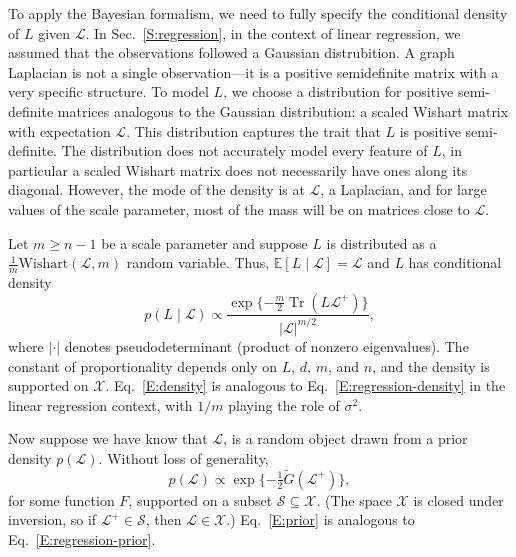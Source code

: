 \documentclass[12pt]{article}
\DeclareMathOperator*{\Tr}{Tr}
\newcommand{\E}{\mathbb{E}}
\theoremstyle{plain}
\begin{document}
To apply the Bayesian formalism, we need to fully specify the
conditional density of $L$ given $\mathcal{L}$.  In
Sec.~\ref{S:regression}, in the context of linear regression, we
assumed that the observations followed a Gaussian distrubition.  A
graph Laplacian is not a single observation---it is a positive
semidefinite matrix with a very specific structure.  To model $L$, we
choose a distribution for positive semi-definite matrices analogous to
the Gaussian distribution: a scaled Wishart matrix with expectation
$\mathcal{L}$.  This distribution captures the trait that $L$ is
positive semi-definite.  The distribution does not accurately model
every feature of $L$, in particular a scaled Wishart matrix does not
necessarily have ones along its diagonal.  However, the mode of the
density is at $\mathcal{L}$, a Laplacian, and for large values of the
scale parameter, most of the mass will be on matrices close to
$\mathcal{L}$.

Let $m \geq n - 1$ be a scale parameter
and suppose $L$ is distributed as a
$\tfrac{1}{m} \mathrm{Wishart}(\mathcal{L}, m)$ random variable.
Thus, $\E[L \mid \mathcal{L}] = \mathcal{L}$ and $L$ has conditional density
\begin{equation}\label{E:density}
  p(L \mid \mathcal{L})
    \propto
      \frac{\exp\{ -\frac{m}{2} \Tr(L \mathcal{L}^+)\}}
           {|\mathcal{L}|^{m/2}},
\end{equation}
where $|\cdot|$ denotes pseudodeterminant (product of nonzero
eigenvalues).  The constant of proportionality depends only on $L$,
$d$, $m$, and $n$, and the density is supported on $\mathcal{X}$.
Eq.~\eqref{E:density} is analogous to Eq.~\eqref{E:regression-density}
in the linear regression context, with $1/m$ playing the role of
$\sigma^2$.

Now suppose we have know that $\mathcal{L}$, is a random object drawn
from a prior density $p(\mathcal{L})$.
Without loss of generality,
\begin{equation}\label{E:prior}
  p(\mathcal{L}) \propto \exp\{ -\tfrac{1}{2} \tilde G(\mathcal{L}^+) \},
\end{equation}
for some function $F$, supported on a subset
$\mathcal{S} \subseteq \mathcal{X}$.  (The space $\mathcal{X}$ is
closed under inversion, so if $\mathcal{L}^{+} \in \mathcal{S}$, then
$\mathcal{L} \in \mathcal{X}$.)
Eq.~\eqref{E:prior} is analogous to Eq.~\eqref{E:regression-prior}.
\end{document}
